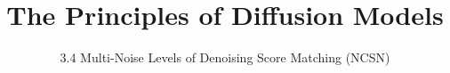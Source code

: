 ﻿%

\graphicspath{{../images/}}
\title{The Principles of Diffusion Models}
\subtitle{3.4 Multi-Noise Levels of Denoising Score Matching (NCSN)}


\begin{frame}
    \titlepage
\end{frame}


